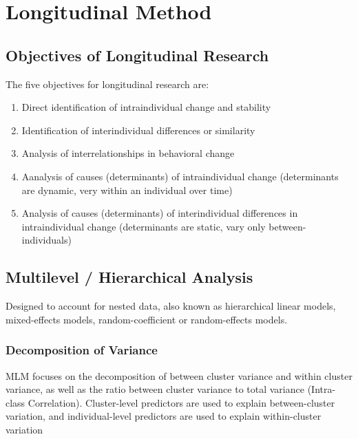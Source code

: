 \chapter{Longitudinal Method}

\section{Objectives of Longitudinal Research} 
The five objectives for longitudinal research are: 
    \begin{enumerate}
        \item Direct identification of intraindividual change and stability 
        \item Identification of interindividual differences or similarity 
        \item Analysis of interrelationships in behavioral change 
        \item Aanalysis of causes (determinants) of intraindividual change (determinants are dynamic, very within an individual over time) 
        \item Analysis of causes (determinants) of interindividual differences in intraindividual change (determinants are static, vary only between-individuals) 
    \end{enumerate}





\section{Multilevel / Hierarchical Analysis} 
Designed to account for nested data, also known as hierarchical linear models, mixed-effects models, random-coefficient or random-effects models. 

\subsection{Decomposition of Variance} 
MLM focuses on the decomposition of between cluster variance and within cluster variance, as well as the ratio between cluster variance to total variance (Intra-class Correlation). Cluster-level predictors are used to explain between-cluster variation, and individual-level predictors are used to explain within-cluster variation 

